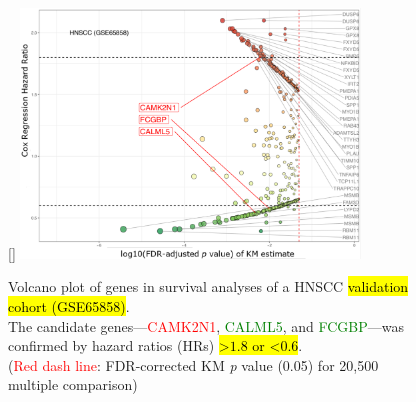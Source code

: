 \documentclass[
paper=landscape,
paper=160mm:90mm, %
fontsize=11pt, %
pagesize, %
parskip=half-, %
]{scrartcl} %
\theoremstyle{mythmstyle} %
\begin{document}
%
\clearpage

\thispagestyle{headings}

\begin{figure}[ht]
[\FBwidth]
{    \includegraphics[width=9cm]{Rplot_GSE65858_CoxHR_CAMK2N1_top3FDRKM.pdf}}
{\captionsetup{labelformat=empty}    \caption{Volcano plot of genes in survival analyses of a HNSCC \hl{validation cohort (GSE65858)}.\\
The candidate genes---\textcolor{red}{CAMK2N1}, \textcolor{green}{CALML5}, and \textcolor{green}{FCGBP}---was confirmed by hazard ratios (HRs) \hl{>$1.8$ or <$0.6$}.\\
{\tiny    (\textcolor{red}{Red dash line}: FDR-corrected KM \textit{p} value (0.05) for 20,500 multiple comparison)}
    }}
\end{figure}

\clearpage


\thispagestyle{headings}
\end{document}
